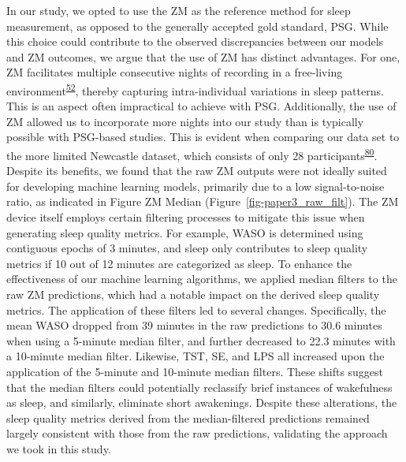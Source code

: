 \documentclass[
  10pt,
]{scrbook}
\begin{document}
In our study, we opted to use the ZM as the reference method for sleep
measurement, as opposed to the generally accepted gold standard, PSG.
While this choice could contribute to the observed discrepancies between
our models and ZM outcomes, we argue that the use of ZM has distinct
advantages. For one, ZM facilitates multiple consecutive nights of
recording in a free-living
environment\textsuperscript{\protect\hyperlink{ref-pedersen_self-administered_2021}{52}},
thereby capturing intra-individual variations in sleep patterns. This is
an aspect often impractical to achieve with PSG. Additionally, the use
of ZM allowed us to incorporate more nights into our study than is
typically possible with PSG-based studies. This is evident when
comparing our data set to the more limited Newcastle dataset, which
consists of only 28
participants\textsuperscript{\protect\hyperlink{ref-hees_novel_2015}{80}}.
Despite its benefits, we found that the raw ZM outputs were not ideally
suited for developing machine learning models, primarily due to a low
signal-to-noise ratio, as indicated in Figure ZM Median
(Figure~\ref{fig-paper3_raw_filt}). The ZM device itself employs certain
filtering processes to mitigate this issue when generating sleep quality
metrics. For example, WASO is determined using contiguous epochs of 3
minutes, and sleep only contributes to sleep quality metrics if 10 out
of 12 minutes are categorized as sleep. To enhance the effectiveness of
our machine learning algorithms, we applied median filters to the raw ZM
predictions, which had a notable impact on the derived sleep quality
metrics. The application of these filters led to several changes.
Specifically, the mean WASO dropped from 39 minutes in the raw
predictions to 30.6 minutes when using a 5-minute median filter, and
further decreased to 22.3 minutes with a 10-minute median filter.
Likewise, TST, SE, and LPS all increased upon the application of the
5-minute and 10-minute median filters. These shifts suggest that the
median filters could potentially reclassify brief instances of
wakefulness as sleep, and similarly, eliminate short awakenings. Despite
these alterations, the sleep quality metrics derived from the
median-filtered predictions remained largely consistent with those from
the raw predictions, validating the approach we took in this study.
\end{document}

